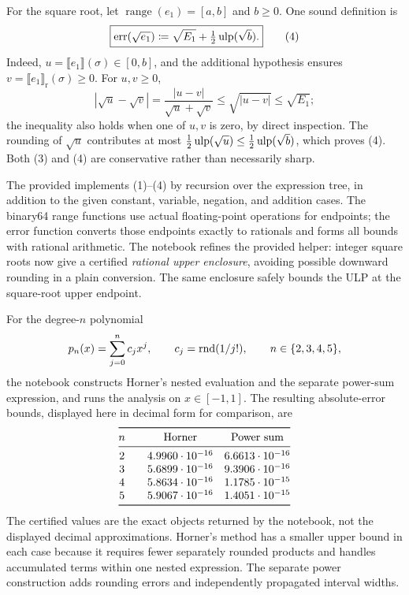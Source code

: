 \documentclass[11pt,oneside]{article}
\begin{document}
\begin{solution}
\begin{problemsubparts}
For the square root, let $\operatorname{range}(e_1)=[a, b]$
and $b\ge0$. One sound definition is
\[
 \boxed{\operatorname{err}(\sqrt{e_1})
 \coloneqq\sqrt{E_1}+\tfrac12\operatorname{ulp}(\sqrt b).}
 \tag{4}
\]
Indeed, $u=\llbracket e_1\rrbracket(\sigma)\in[0, b]$,
and the additional hypothesis ensures
$v=\llbracket e_1\rrbracket_{\mathrm r}(\sigma)\ge0$.
For $u, v\ge0$,
\[
 |\sqrt u-\sqrt v|
 =\frac{|u-v|}{\sqrt u+\sqrt v}
 \le\sqrt{|u-v|}\le\sqrt{E_1};
\]
the inequality also holds when one of $u, v$ is zero, by direct
inspection. The rounding of $\sqrt u$ contributes at most
$\tfrac12\operatorname{ulp}(\sqrt u)\le\tfrac12\operatorname{ulp}(\sqrt b)$,
which proves (4). Both (3) and (4) are conservative rather than
necessarily sharp.

\item The provided  implements (1)--(4) by recursion
over the expression tree, in addition to the given constant, variable,
negation, and addition cases. The binary64 range functions use actual
floating-point operations for endpoints; the error function converts
those endpoints exactly to rationals and forms all bounds with rational
arithmetic. The notebook refines the provided  helper:
integer square roots now give a certified \emph{rational upper
enclosure}, avoiding possible downward rounding in a plain
 conversion. The same enclosure safely bounds
the ULP at the square-root upper endpoint.

For the degree-$n$ polynomial
\[
 p_n(x)=\sum_{j=0}^{n}c_jx^j,
 \qquad c_j=\operatorname{rnd}(1/j!), \qquad n\in\{2, 3, 4, 5\},
\]
the notebook constructs Horner's nested evaluation and the separate
power-sum expression, and runs the analysis on $x\in[-1, 1]$.
The resulting absolute-error bounds, displayed here in decimal
form for comparison, are
\[
 \begin{array}{@{}c@{\qquad}cc@{}}
 \toprule
 n & \text{Horner} & \text{Power sum} \\
 \midrule
 2&4.9960\cdot10^{-16}&6.6613\cdot10^{-16}\\
 3&5.6899\cdot10^{-16}&9.3906\cdot10^{-16}\\
 4&5.8634\cdot10^{-16}&1.1785\cdot10^{-15}\\
 5&5.9067\cdot10^{-16}&1.4051\cdot10^{-15}\\
 \bottomrule
 \end{array}
\]
The certified values are the exact  objects returned
by the notebook, not the displayed decimal approximations. Horner's
method has a smaller upper bound in each case because it requires
fewer separately rounded products and handles accumulated terms
within one nested expression. The separate power construction adds
rounding errors and independently propagated interval widths.
\end{problemsubparts}
\end{solution}
\end{document}
